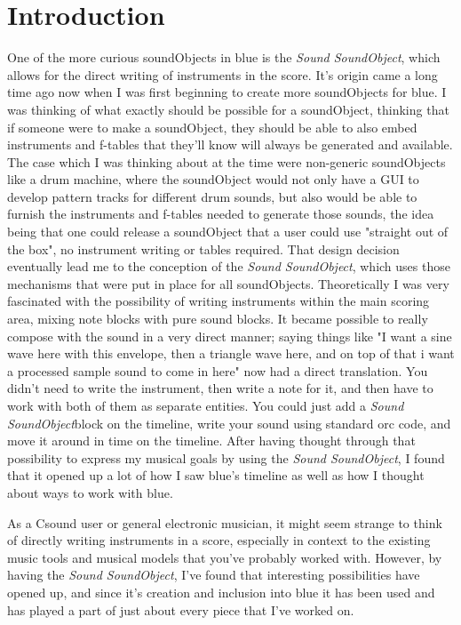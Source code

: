 \section{Introduction}

One of the more curious soundObjects in blue is the \emph{Sound
SoundObject}, which allows for the direct writing of instruments in the
score. It's origin came a long time ago now when I was first beginning
to create more soundObjects for blue. I was thinking of what exactly
should be possible for a soundObject, thinking that if someone were to
make a soundObject, they should be able to also embed instruments and
f-tables that they'll know will always be generated and available. The
case which I was thinking about at the time were non-generic
soundObjects like a drum machine, where the soundObject would not only
have a GUI to develop pattern tracks for different drum sounds, but also
would be able to furnish the instruments and f-tables needed to generate
those sounds, the idea being that one could release a soundObject that a
user could use "straight out of the box", no instrument writing or
tables required. That design decision eventually lead me to the
conception of the \emph{Sound SoundObject}, which uses those mechanisms
that were put in place for all soundObjects. Theoretically I was very
fascinated with the possibility of writing instruments within the main
scoring area, mixing note blocks with pure sound blocks. It became
possible to really compose with the sound in a very direct manner;
saying things like "I want a sine wave here with this envelope, then a
triangle wave here, and on top of that i want a processed sample sound
to come in here" now had a direct translation. You didn't need to write
the instrument, then write a note for it, and then have to work with
both of them as separate entities. You could just add a \emph{Sound
SoundObject}block on the timeline, write your sound using standard orc
code, and move it around in time on the timeline. After having thought
through that possibility to express my musical goals by using the
\emph{Sound SoundObject}, I found that it opened up a lot of how I saw
blue's timeline as well as how I thought about ways to work with blue.

As a Csound user or general electronic musician, it might seem strange
to think of directly writing instruments in a score, especially in
context to the existing music tools and musical models that you've
probably worked with. However, by having the \emph{Sound SoundObject},
I've found that interesting possibilities have opened up, and since it's
creation and inclusion into blue it has been used and has played a part
of just about every piece that I've worked on.

